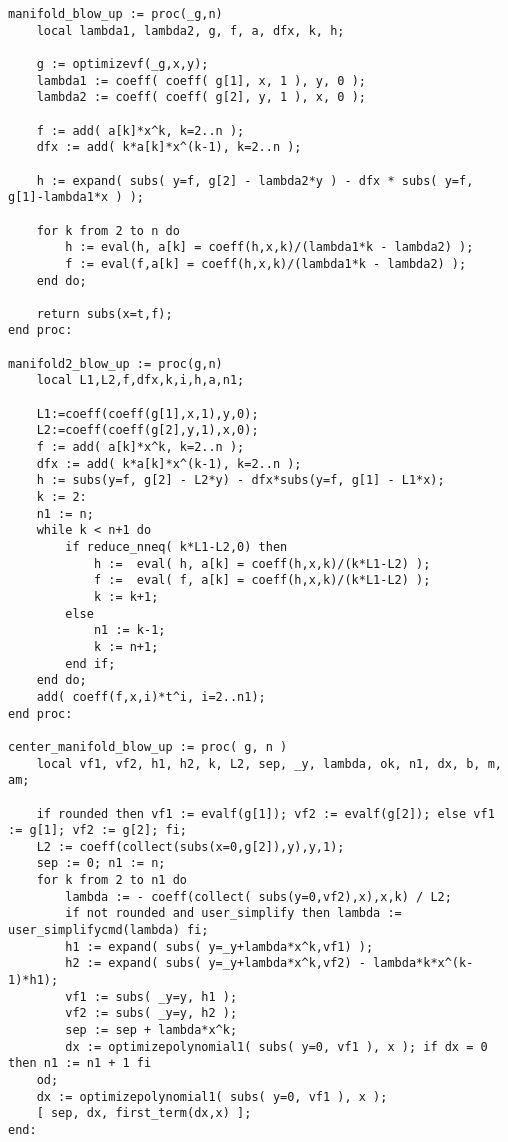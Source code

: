 \documentclass[a4paper,10pt]{article}
\begin{document}
\begin{lstlisting}[name=blowup]
manifold_blow_up := proc(_g,n)
    local lambda1, lambda2, g, f, a, dfx, k, h;

    g := optimizevf(_g,x,y);
    lambda1 := coeff( coeff( g[1], x, 1 ), y, 0 );
    lambda2 := coeff( coeff( g[2], y, 1 ), x, 0 );

    f := add( a[k]*x^k, k=2..n );
    dfx := add( k*a[k]*x^(k-1), k=2..n );

    h := expand( subs( y=f, g[2] - lambda2*y ) - dfx * subs( y=f, g[1]-lambda1*x ) );

    for k from 2 to n do
        h := eval(h, a[k] = coeff(h,x,k)/(lambda1*k - lambda2) );
        f := eval(f,a[k] = coeff(h,x,k)/(lambda1*k - lambda2) );
    end do;

    return subs(x=t,f);
end proc:

manifold2_blow_up := proc(g,n)
    local L1,L2,f,dfx,k,i,h,a,n1;

    L1:=coeff(coeff(g[1],x,1),y,0);
    L2:=coeff(coeff(g[2],y,1),x,0);
    f := add( a[k]*x^k, k=2..n );
    dfx := add( k*a[k]*x^(k-1), k=2..n );
    h := subs(y=f, g[2] - L2*y) - dfx*subs(y=f, g[1] - L1*x);
    k := 2:
    n1 := n;
    while k < n+1 do
        if reduce_nneq( k*L1-L2,0) then
            h :=  eval( h, a[k] = coeff(h,x,k)/(k*L1-L2) );
            f :=  eval( f, a[k] = coeff(h,x,k)/(k*L1-L2) );
            k := k+1;
        else
            n1 := k-1;
            k := n+1;
        end if;
    end do;
    add( coeff(f,x,i)*t^i, i=2..n1);
end proc:

center_manifold_blow_up := proc( g, n )
    local vf1, vf2, h1, h2, k, L2, sep, _y, lambda, ok, n1, dx, b, m, am;

    if rounded then vf1 := evalf(g[1]); vf2 := evalf(g[2]); else vf1 := g[1]; vf2 := g[2]; fi;
    L2 := coeff(collect(subs(x=0,g[2]),y),y,1);
    sep := 0; n1 := n;
    for k from 2 to n1 do
        lambda := - coeff(collect( subs(y=0,vf2),x),x,k) / L2;
        if not rounded and user_simplify then lambda := user_simplifycmd(lambda) fi;
        h1 := expand( subs( y=_y+lambda*x^k,vf1) );
        h2 := expand( subs( y=_y+lambda*x^k,vf2) - lambda*k*x^(k-1)*h1);
        vf1 := subs( _y=y, h1 );
        vf2 := subs( _y=y, h2 );
        sep := sep + lambda*x^k;
        dx := optimizepolynomial1( subs( y=0, vf1 ), x ); if dx = 0 then n1 := n1 + 1 fi
    od;
    dx := optimizepolynomial1( subs( y=0, vf1 ), x );
    [ sep, dx, first_term(dx,x) ];
end:
\end{lstlisting}
\end{document}
